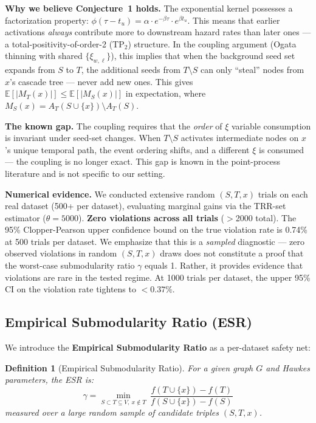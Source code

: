 \documentclass[10pt,conference]{IEEEtran}
\newtheorem{definition}{Definition}
\begin{document}
\textbf{Why we believe Conjecture~1 holds.}
The exponential kernel possesses a factorization property:
$\phi(\tau - t_u) = \alpha \cdot e^{-\beta\tau} \cdot e^{\beta t_u}$.
This means that earlier activations \emph{always} contribute more to downstream hazard rates than later ones — a total-positivity-of-order-2 (TP$_2$) structure.
In the coupling argument (Ogata thinning with shared $\{\xi_{w,\ell}\}$), this implies that when the background seed set expands from $S$ to $T$, the additional seeds from $T \setminus S$ can only ``steal'' nodes from $x$'s cascade tree — never add new ones.
This gives $\mathbb{E}[|M_T(x)|] \le \mathbb{E}[|M_S(x)|]$ in expectation, where $M_S(x) = A_T(S \cup \{x\}) \setminus A_T(S)$.

\textbf{The known gap.}
The coupling requires that the \emph{order} of $\xi$ variable consumption is invariant under seed-set changes.
When $T \setminus S$ activates intermediate nodes on $x$'s unique temporal path, the event ordering shifts, and a different $\xi$ is consumed — the coupling is no longer exact.
This gap is known in the point-process literature and is not specific to our setting.

\textbf{Numerical evidence.}
We conducted extensive random $(S,T,x)$ trials on each real dataset (500+ per dataset), evaluating marginal gains via the TRR-set estimator ($\theta=5000$).
\textbf{Zero violations across all trials} ($>$2000 total).
The 95\% Clopper-Pearson upper confidence bound on the true violation rate is 0.74\% at 500 trials per dataset. We emphasize that this is a \emph{sampled} diagnostic — zero observed violations in random $(S,T,x)$ draws does not constitute a proof that the worst-case submodularity ratio $\gamma$ equals 1. Rather, it provides evidence that violations are rare in the tested regime.
At 1000 trials per dataset, the upper 95\% CI on the violation rate tightens to ${<}0.37\%$.

\subsection{Empirical Submodularity Ratio (ESR)}

We introduce the \textbf{Empirical Submodularity Ratio} as a per-dataset safety net:

\begin{definition}[Empirical Submodularity Ratio]
For a given graph $G$ and Hawkes parameters, the ESR is:
\begin{equation}
\gamma = \min_{S \subset T \subseteq V,\ x \notin T}\ \frac{f(T \cup \{x\}) - f(T)}{f(S \cup \{x\}) - f(S)}
\label{eq:esr}
\end{equation}
measured over a large random sample of candidate triples $(S, T, x)$.
\end{definition}
\end{document}
